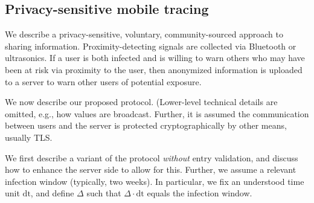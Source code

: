 \documentclass{article}
\begin{document}
\subsection{Privacy-sensitive mobile tracing} \label{sect:Bluetooth}

We describe a privacy-sensitive, voluntary, community-sourced approach to sharing information. 
Proximity-detecting signals are collected via Bluetooth or ultrasonics.  If a user is both infected and is willing to warn others who may have been at risk via proximity to the user, then anonymized information is uploaded to a server to warn other users of potential exposure. 


We now describe our proposed protocol. (Lower-level technical details are omitted, e.g., how values are broadcast. Further, it is assumed the communication between users and the server is protected cryptographically by other means, usually TLS. 


\newcommand{\id}{\mathrm{id}}
\newcommand{\dt}{\mathrm{dt}}
 We first describe a variant of the protocol {\em without} entry validation, and discuss how to enhance the server side to allow for this. Further, we assume a relevant infection window (typically, two weeks). In particular, we fix an understood time unit $\dt$, and define $\Delta$ such that $\Delta \cdot \dt$ equals the infection window.
\end{document}
